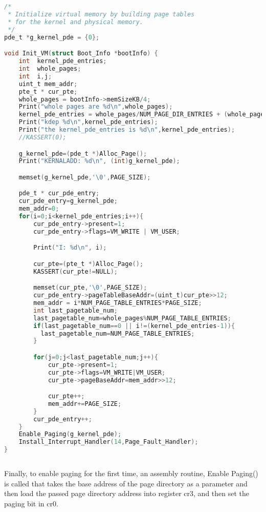 \documentclass[11pt]{article}
\begin{document}
\begin{lstlisting}[language=c]


/*
 * Initialize virtual memory by building page tables
 * for the kernel and physical memory.
 */
pde_t *g_kernel_pde = {0};

void Init_VM(struct Boot_Info *bootInfo) {
    int  kernel_pde_entries;
    int  whole_pages;
    int  i,j;
    uint_t mem_addr;
    pte_t * cur_pte;
    whole_pages = bootInfo->memSizeKB/4;
    Print("whole pages are %d\n",whole_pages);
    kernel_pde_entries = whole_pages/NUM_PAGE_DIR_ENTRIES + (whole_pages % NUM_PAGE_DIR_ENTRIES == 0 ? 0:1);
    Print("kdep %d\n",kernel_pde_entries);
    Print("the kernel_pde_entries is %d\n",kernel_pde_entries);
    //KASSERT(0);

    g_kernel_pde=(pde_t *)Alloc_Page();
    Print("KERNALADD: %d\n", (int)g_kernel_pde);

    memset(g_kernel_pde,'\0',PAGE_SIZE);

    pde_t * cur_pde_entry;
    cur_pde_entry=g_kernel_pde;
    mem_addr=0;
    for(i=0;i<kernel_pde_entries;i++){
        cur_pde_entry->present=1;
        cur_pde_entry->flags=VM_WRITE | VM_USER;

        Print("I: %d\n", i);

        cur_pte=(pte_t *)Alloc_Page();
        KASSERT(cur_pte!=NULL);

        memset(cur_pte,'\0',PAGE_SIZE);
        cur_pde_entry->pageTableBaseAddr=(uint_t)cur_pte>>12;
        mem_addr = i*NUM_PAGE_TABLE_ENTRIES*PAGE_SIZE;
        int last_pagetable_num;
        last_pagetable_num=whole_pages%NUM_PAGE_TABLE_ENTRIES;
        if(last_pagetable_num==0 || i!=(kernel_pde_entries-1)){
          last_pagetable_num=NUM_PAGE_TABLE_ENTRIES;
        }

        for(j=0;j<last_pagetable_num;j++){
            cur_pte->present=1;
            cur_pte->flags=VM_WRITE|VM_USER;
            cur_pte->pageBaseAddr=mem_addr>>12;

            cur_pte++;
            mem_addr+=PAGE_SIZE;
        }
        cur_pde_entry++;
    }
    Enable_Paging(g_kernel_pde);
    Install_Interrupt_Handler(14,Page_Fault_Handler);
}
    
\end{lstlisting}


Finally, to enable paging for the first time, an assembly routine, Enable Paging() is called that takes the base address of the page directory as a parameter and then load the passed page directory address into register cr3, and then set the paging bit in cr0.
\end{document}
